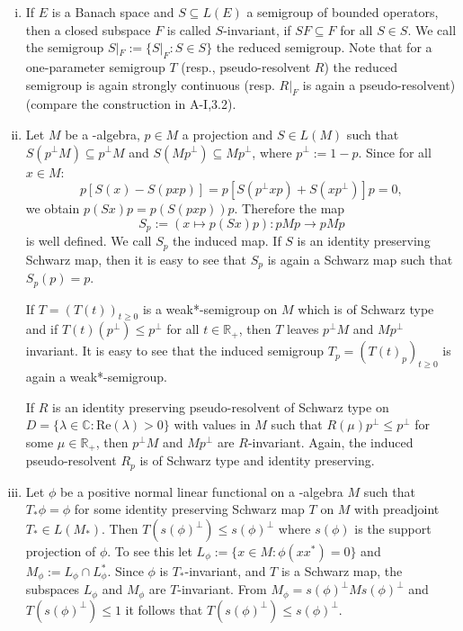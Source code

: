 \begin{enumerate}[(i)]
\item
If $ E $ is a Banach space and $ S \subseteq L(E) $ a semigroup of bounded operators, then a closed subspace $ F $ is called $ S $-invariant, if $ SF \subseteq F $ for all $ S \in S $.
We call the semigroup $ S|_F := \{S|_F : S \in S \} $ the reduced semigroup.
Note that for a one-parameter semigroup $ T $ (resp., pseudo-resolvent $ R $) the reduced semigroup is again strongly continuous (resp. $ R|_F $ is again a pseudo-resolvent) (compare the construction in A-I,3.2).

\item
Let $ M $ be a \WA-algebra, $ p \in M $ a projection and $ S \in L(M) $ such that $ S(p^{\perp}M) \subseteq p^{\perp}M $ and $ S(Mp^{\perp}) \subseteq Mp^{\perp} $, where $ p^{\perp} := 1-p $.
Since for all $ x \in M $:
\[
p[S(x) - S(pxp)] = p[S(p^{\perp}xp) + S(xp^{\perp})]p = 0,
\]
we obtain $ p(Sx)p = p(S(pxp))p $.
Therefore the map
\[
S_p := (x \mapsto p(Sx)p) : pMp \to pMp
\]
is well defined.
We call $ S_p $ the induced map.
If $ S $ is an identity preserving Schwarz map, then it is easy to see that $ S_p $ is again a Schwarz map such that $ S_p(p) = p $.

If $ T = (T(t))_{t\geq0} $ is a weak*-semigroup on $ M $ which is of Schwarz type and if $ T(t)(p^{\perp}) \leq p^{\perp} $ for all $ t \in \mathbb{R}_+ $, then $ T $ leaves $ p^{\perp}M $ and $ Mp^{\perp} $ invariant.
It is easy to see that the induced semigroup $ T_p = (T(t)_p)_{t\geq0} $ is again a weak*-semigroup.

If $ R $ is an identity preserving pseudo-resolvent of Schwarz type on $ D = \{\lambda \in \mathbb{C} : \text{Re}(\lambda) > 0\} $ with values in $ M $ such that $ R(\mu)p^{\perp} \leq p^{\perp} $ for some $ \mu \in \mathbb{R}_+ $, then $ p^{\perp}M $ and $ Mp^{\perp} $ are $ R $-invariant.
Again, the induced pseudo-resolvent $ R_p $ is of Schwarz type and identity preserving.

\item
Let $ \phi $ be a positive normal linear functional on a \WA-algebra $ M $ such that $ T_{*}\phi = \phi $ for some identity preserving Schwarz map $ T $ on $ M $ with preadjoint $ T_{*} \in L(M_{*}) $.
Then $ T(s(\phi)^{\perp}) \leq s(\phi)^{\perp} $ where $ s(\phi) $ is the support projection of $ \phi $.
To see this let $ L_{\phi} := \{x \in M: \phi(xx^*) = 0\} $ and $ M_{\phi} := L_{\phi} \cap L_{\phi}^* $.
Since $ \phi $ is $ T_{*} $-invariant, and $ T $ is a Schwarz map, the subspaces $ L_{\phi} $ and $ M_{\phi} $ are $ T $-invariant.
From $ M_{\phi} = s(\phi)^{\perp}Ms(\phi)^{\perp} $ and $ T(s(\phi)^{\perp}) \leq 1 $ it follows that $ T(s(\phi)^{\perp}) \leq s(\phi)^{\perp} $.

\end{enumerate}
%

